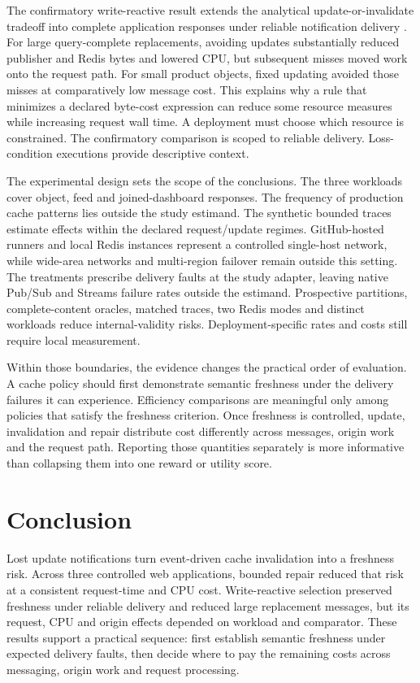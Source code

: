 \documentclass[pdflatex,sn-mathphys-num]{sn-jnl}
\begin{document}
The confirmatory write-reactive result extends the analytical update-or-invalidate tradeoff into complete application responses under reliable notification delivery \citep{mao2024cachefreshness}. For large query-complete replacements, avoiding updates substantially reduced publisher and Redis bytes and lowered CPU, but subsequent misses moved work onto the request path. For small product objects, fixed updating avoided those misses at comparatively low message cost. This explains why a rule that minimizes a declared byte-cost expression can reduce some resource measures while increasing request wall time. A deployment must choose which resource is constrained. The confirmatory comparison is scoped to reliable delivery. Loss-condition executions provide descriptive context.

The experimental design sets the scope of the conclusions. The three workloads cover object, feed and joined-dashboard responses. The frequency of production cache patterns lies outside the study estimand. The synthetic bounded traces estimate effects within the declared request/update regimes. GitHub-hosted runners and local Redis instances represent a controlled single-host network, while wide-area networks and multi-region failover remain outside this setting. The treatments prescribe delivery faults at the study adapter, leaving native Pub/Sub and Streams failure rates outside the estimand. Prospective partitions, complete-content oracles, matched traces, two Redis modes and distinct workloads reduce internal-validity risks. Deployment-specific rates and costs still require local measurement.

Within those boundaries, the evidence changes the practical order of evaluation. A cache policy should first demonstrate semantic freshness under the delivery failures it can experience. Efficiency comparisons are meaningful only among policies that satisfy the freshness criterion. Once freshness is controlled, update, invalidation and repair distribute cost differently across messages, origin work and the request path. Reporting those quantities separately is more informative than collapsing them into one reward or utility score.

\section{Conclusion}\label{conclusion}

Lost update notifications turn event-driven cache invalidation into a freshness risk. Across three controlled web applications, bounded repair reduced that risk at a consistent request-time and CPU cost. Write-reactive selection preserved freshness under reliable delivery and reduced large replacement messages, but its request, CPU and origin effects depended on workload and comparator. These results support a practical sequence: first establish semantic freshness under expected delivery faults, then decide where to pay the remaining costs across messaging, origin work and request processing.
\end{document}
